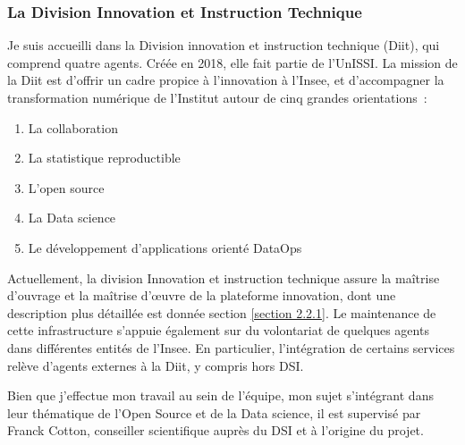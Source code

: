 \subsubsection{La Division Innovation et Instruction Technique}
Je suis accueilli dans la Division innovation et instruction technique (Diit), qui comprend quatre agents. Créée en 2018, elle fait partie de l'UnISSI. La mission de la Diit est d'offrir un cadre propice à l'innovation à l'Insee, et d'accompagner la transformation numérique de l'Institut autour de cinq grandes orientations~:
\begin{enumerate}
    \item La collaboration
    \item La statistique reproductible
    \item L'open source 
    \item La Data science
    \item Le développement d'applications orienté DataOps
    \newline
\end{enumerate}

Actuellement, la division Innovation et instruction technique assure la maîtrise d’ouvrage et la maîtrise d’œuvre de la plateforme innovation, dont une description plus détaillée est donnée section \ref{section 2.2.1}. Le maintenance de cette infrastructure s’appuie également sur du volontariat de quelques agents dans différentes entités de l’Insee. En particulier, l’intégration de certains services relève d’agents externes à la Diit, y compris hors DSI. 
\newline

Bien que j'effectue mon travail au sein de l'équipe, mon sujet s'intégrant dans leur thématique de l'Open Source et de la Data science, il est supervisé par Franck Cotton, conseiller scientifique auprès du DSI et à l'origine du projet. 
\newline

